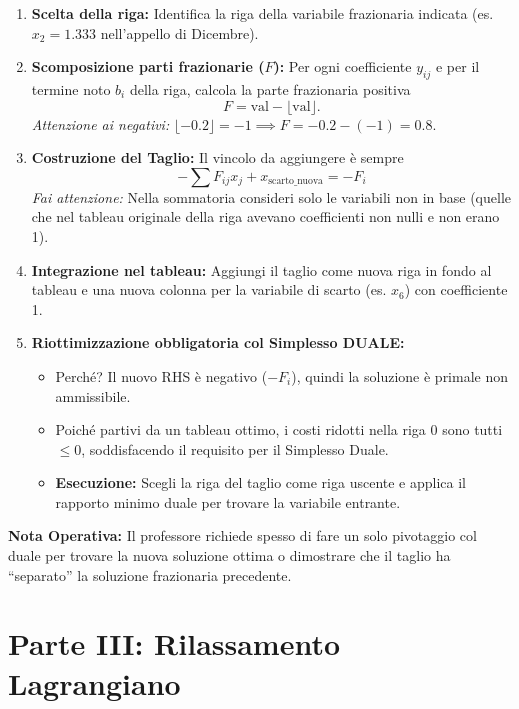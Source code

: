 \documentclass[11pt, a4paper]{article}
\begin{document}
\begin{enumerate}
  \item \textbf{Scelta della riga:} Identifica la riga della variabile frazionaria indicata (es. $x_2 = 1.333$ nell'appello di Dicembre).
  \item \textbf{Scomposizione parti frazionarie ($F$):} Per ogni coefficiente $y_{ij}$ e per il termine noto $b_i$ della riga, calcola la parte frazionaria positiva
    \[
      F = \text{val} - \lfloor \text{val} \rfloor.
    \]
    \emph{Attenzione ai negativi:} $\lfloor -0.2 \rfloor = -1 \implies F = -0.2 - (-1) = 0.8$.
  \item \textbf{Costruzione del Taglio:} Il vincolo da aggiungere è sempre
    \[
      -\sum F_{ij} x_j + x_{\text{scarto\_nuova}} = -F_i
    \]
    \emph{Fai attenzione:} Nella sommatoria consideri solo le variabili non in base (quelle che nel tableau originale della riga avevano coefficienti non nulli e non erano 1).
  \item \textbf{Integrazione nel tableau:} Aggiungi il taglio come nuova riga in fondo al tableau e una nuova colonna per la variabile di scarto (es. $x_6$) con coefficiente 1.
  \item \textbf{Riottimizzazione obbligatoria col Simplesso DUALE:}
    \begin{itemize}
      \item Perché? Il nuovo RHS è negativo ($-F_i$), quindi la soluzione è primale non ammissibile.
      \item Poiché partivi da un tableau ottimo, i costi ridotti nella riga 0 sono tutti $\le 0$, soddisfacendo il requisito per il Simplesso Duale.
      \item \textbf{Esecuzione:} Scegli la riga del taglio come riga uscente e applica il rapporto minimo duale per trovare la variabile entrante.
    \end{itemize}
\end{enumerate}

\noindent
\textbf{Nota Operativa:} Il professore richiede spesso di fare un solo pivotaggio col duale per trovare la nuova soluzione ottima o dimostrare che il taglio ha ``separato'' la soluzione frazionaria precedente.

\section{Parte III: Rilassamento Lagrangiano}
\end{document}

